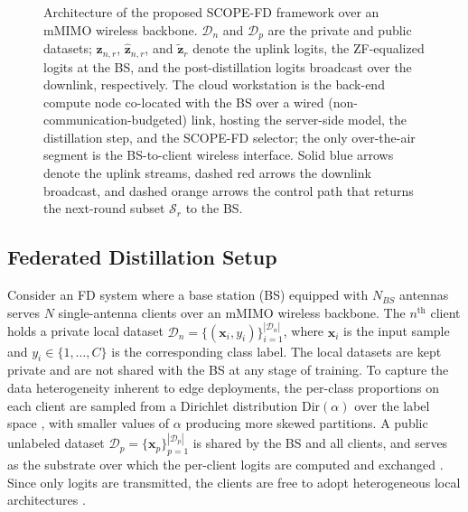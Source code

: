 \documentclass[journal]{IEEEtran}
\begin{document}
\begin{figure}[!t]
\begin{tikzpicture}
\end{tikzpicture}
\caption{Architecture of the proposed SCOPE-FD framework over an mMIMO wireless backbone. $\mathcal{D}_n$ and $\mathcal{D}_p$ are the private and public datasets; $\bm{z}_{n,r}$, $\hat{\bm{z}}_{n,r}$, and $\tilde{\bm{z}}_r$ denote the uplink logits, the ZF-equalized logits at the BS, and the post-distillation logits broadcast over the downlink, respectively. The cloud workstation is the back-end compute node co-located with the BS over a wired (non-communication-budgeted) link, hosting the server-side model, the distillation step, and the SCOPE-FD selector; the only over-the-air segment is the BS-to-client wireless interface. Solid blue arrows denote the uplink streams, dashed red arrows the downlink broadcast, and dashed orange arrows the control path that returns the next-round subset $\mathcal{S}_r$ to the BS.}
\label{fig:system_model}
\end{figure}

\subsection{Federated Distillation Setup}
\label{ssec:fd-setup}

Consider an FD system where a base station (BS) equipped with $N_{BS}$ antennas serves $N$ single-antenna clients over an mMIMO wireless backbone. The $n^{\text{th}}$ client holds a private local dataset $\mathcal{D}_n = \{(\bm{x}_i, y_i)\}_{i=1}^{|\mathcal{D}_n|}$, where $\bm{x}_i$ is the input sample and $y_i \in \{1, \dots, C\}$ is the corresponding class label. The local datasets are kept private and are not shared with the BS at any stage of training. To capture the data heterogeneity inherent to edge deployments, the per-class proportions on each client are sampled from a Dirichlet distribution $\text{Dir}(\alpha)$ over the label space \cite{hsu2019measuring}, with smaller values of $\alpha$ producing more skewed partitions. A public unlabeled dataset $\mathcal{D}_p = \{\bm{x}_p\}_{p=1}^{|\mathcal{D}_p|}$ is shared by the BS and all clients, and serves as the substrate over which the per-client logits are computed and exchanged \cite{itahara2023distillation}. Since only logits are transmitted, the clients are free to adopt heterogeneous local architectures \cite{chan2021fedhe}.
\end{document}
